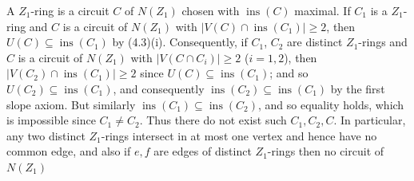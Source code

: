 A $Z_1$-ring is a circuit $C$ of $N(Z_1)$ chosen with $\operatorname{ins}(C)$ maximal. If $C_1$ is a $Z_1$-ring and $C$ is a circuit of $N(Z_1)$ with $|V(C) \cap \operatorname{ins}(C_1)| \ge 2$, then $U(C) \subseteq \operatorname{ins}(C_1)$ by (4.3)(i). Consequently, if $C_1$, $C_2$ are distinct $Z_1$-rings and $C$ is a circuit of $N(Z_1)$ with $|V(C \cap C_i)| \ge 2$ ($i = 1, 2$), then $|V(C_2) \cap \operatorname{ins}(C_1)| \ge 2$ since $U(C) \subseteq \operatorname{ins}(C_1)$; and so $U(C_2) \subseteq \operatorname{ins}(C_1)$, and consequently $\operatorname{ins}(C_2) \subseteq \operatorname{ins}(C_1)$ by the first slope axiom. But similarly $\operatorname{ins}(C_1) \subseteq \operatorname{ins}(C_2)$, and so equality holds, which is impossible since $C_1 \ne C_2$. Thus there do not exist such $C_1, C_2, C$. In particular, any two distinct $Z_1$-rings intersect in at most one vertex and hence have no common edge, and also if $e, f$ are edges of distinct $Z_1$-rings then no circuit of $N(Z_1)$
